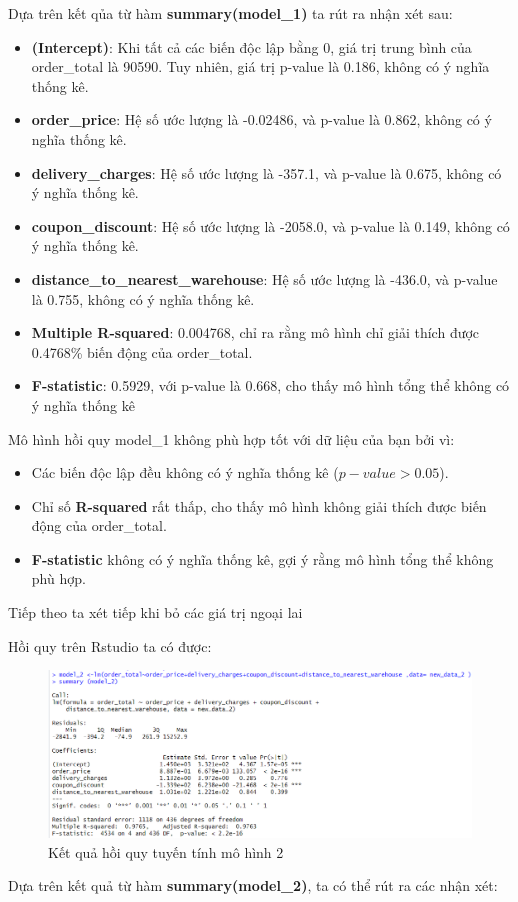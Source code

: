 Dựa trên kết qủa từ hàm \textbf{summary(model\_1)} ta rút ra nhận xét sau:
\begin{itemize}
\item \textbf{(Intercept)}: Khi tất cả các biến độc lập bằng 0, giá trị trung bình của order\_total là 90590. Tuy nhiên, giá trị p-value là 0.186, không có ý nghĩa thống kê.
\item \textbf{order\_price}: Hệ số ước lượng là -0.02486, và p-value là 0.862, không có ý nghĩa thống kê.
\item \textbf{delivery\_charges}: Hệ số ước lượng là -357.1, và p-value là 0.675, không có ý nghĩa thống kê.
\item \textbf{coupon\_discount}: Hệ số ước lượng là -2058.0, và p-value là 0.149, không có ý nghĩa thống kê.
\item \textbf{distance\_to\_nearest\_warehouse}: Hệ số ước lượng là -436.0, và p-value là 0.755, không có ý nghĩa thống kê.
\item\textbf{Multiple R-squared}: 0.004768, chỉ ra rằng mô hình chỉ giải thích được 0.4768\% biến động của order\_total.
\item\textbf{F-statistic}: 0.5929, với p-value là 0.668, cho thấy mô hình tổng thể không có ý nghĩa thống kê
\end{itemize}
Mô hình hồi quy model\_1 không phù hợp tốt với dữ liệu của bạn bởi vì:
\begin{itemize}
\item Các biến độc lập đều không có ý nghĩa thống kê ($p-value > 0.05$).
\item Chỉ số \textbf{R-squared} rất thấp, cho thấy mô hình không giải thích được biến động của order\_total.
\item\textbf{F-statistic} không có ý nghĩa thống kê, gợi ý rằng mô hình tổng thể không phù hợp.
\end{itemize}

Tiếp theo ta xét tiếp khi bỏ các giá trị ngoại lai

Hồi quy trên Rstudio ta có được:
\begin{figure}[ht]
  \centering
  \includegraphics[width=0.7\linewidth]{graphics/5.5.3.png}
  \caption{Kết quả hồi quy tuyến tính mô hình 2 }
\end{figure} 
\newpage
Dựa trên kết quả từ hàm \textbf{summary(model\_2)}, ta có thể rút ra các nhận xét:

